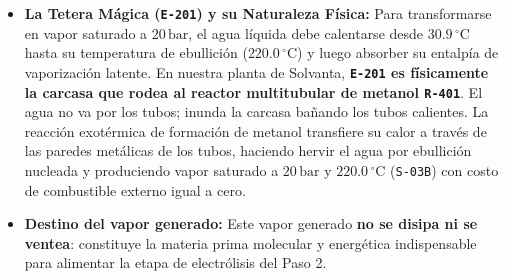 \documentclass[11pt,a4paper]{article}
\begin{document}
\begin{itemize}
    \item \textbf{La Tetera Mágica (\texttt{E-201}) y su Naturaleza Física:} Para transformarse en vapor saturado a $20\,\text{bar}$, el agua líquida debe calentarse desde $30.9\,^\circ\text{C}$ hasta su temperatura de ebullición ($220.0\,^\circ\text{C}$) y luego absorber su entalpía de vaporización latente. En nuestra planta de Solvanta, \textbf{\texttt{E-201} es físicamente la carcasa que rodea al reactor multitubular de metanol \texttt{R-401}}. El agua no va por los tubos; inunda la carcasa bañando los tubos calientes. La reacción exotérmica de formación de metanol transfiere su calor a través de las paredes metálicas de los tubos, haciendo hervir el agua por ebullición nucleada y produciendo vapor saturado a $20\,\text{bar}$ y $220.0\,^\circ\text{C}$ (\texttt{S-03B}) con costo de combustible externo igual a cero.
    
    \item \textbf{Destino del vapor generado:} Este vapor generado \textbf{no se disipa ni se ventea}: constituye la materia prima molecular y energética indispensable para alimentar la etapa de electrólisis del Paso 2.
\end{itemize}
\end{document}
